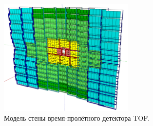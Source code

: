 

\begin{figure}[H]
\centering
\includegraphics[width=0.6\textwidth]{pictures/TOF.png}
\caption{Модель стены время-пролётного детектора TOF.}
\label{fig:TOF}
\end{figure}

